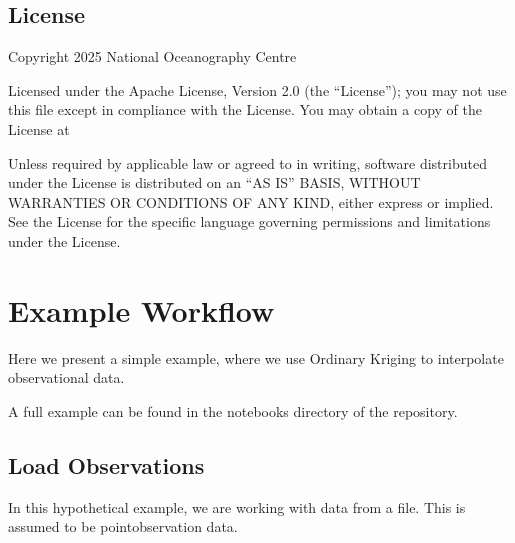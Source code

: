 \documentclass[letterpaper,10pt,english]{sphinxmanual}
\begin{document}
\section{License}
\label{\detokenize{authors:license}}
\sphinxAtStartPar
Copyright 2025 National Oceanography Centre

\sphinxAtStartPar
Licensed under the Apache License, Version 2.0 (the “License”);
you may not use this file except in compliance with the License.
You may obtain a copy of the License at
\begin{quote}

\sphinxAtStartPar
{}
\end{quote}

\sphinxAtStartPar
Unless required by applicable law or agreed to in writing, software
distributed under the License is distributed on an “AS IS” BASIS,
WITHOUT WARRANTIES OR CONDITIONS OF ANY KIND, either express or implied.
See the License for the specific language governing permissions and
limitations under the License.

\sphinxstepscope


\chapter{Example Workflow}
\label{\detokenize{workflow:example-workflow}}\label{\detokenize{workflow::doc}}
\sphinxAtStartPar
Here we present a simple example, where we use Ordinary Kriging to interpolate observational data.

\sphinxAtStartPar
A full example can be found in the notebooks directory of the repository.


\section{Load Observations}
\label{\detokenize{workflow:load-observations}}
\sphinxAtStartPar
In this hypothetical example, we are working with data from a  file. This is assumed to be
point\sphinxhyphen{}observation data.

\begin{sphinxVerbatim}[commandchars=\\\{\}]
   
\end{sphinxVerbatim}
\end{document}
